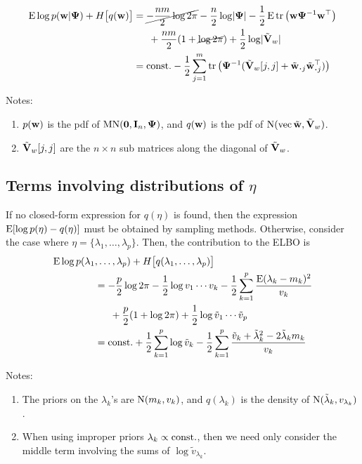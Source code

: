 \begin{align*}
  \E \log p(\bw|\bPsi) + H \big[q(\bw) \big] 
  &= \cancel{-\half[nm]\log 2\pi} - \half[n]\log\abs{\bPsi} - \half\E\tr \big( \bw \bPsi^{-1} \bw^\top \big) \\
  &\phantom{==} + \half[nm](1 + \cancel{\log 2\pi}) + \half\log\abs{\tilde\bV_w} \\
  &= \const 
  - \half \sum_{j=1}^m \tr \big(\bPsi^{-1} (\tilde\bV_w[j,j]  + \tilde\bw_{\bigcdot j}\tilde\bw_{\bigcdot j}^\top)\big)
\end{align*}

Notes:
\begin{enumerate}
  \item $p(\bw)$ is the pdf of $\MN(\bzero,\bI_n,\bPsi)$, and $q(\bw)$ is the pdf of $\N(\vecc \tilde\bw,\tilde\bV_w)$.
  \item $\tilde\bV_w[j,j]$ are the $n \times n$ sub matrices along the diagonal of $\tilde\bV_w$.
\end{enumerate}

\subsection{Terms involving distributions of $\eta$}

If no closed-form expression for $q(\eta)$ is found, then the expression $\E [\log p(\eta) - q(\eta)]$ must be obtained by sampling methods.
Otherwise, consider the case where $\eta =\{\lambda_1,\dots,\lambda_p\}$.
Then, the contribution to the ELBO is
\begin{align*}
  \E \log p(\lambda_1 & ,\dots,\lambda_p) + H\big[q(\lambda_1,\dots,\lambda_p) \big] \\
  &=  -\half[p]\log 2\pi - \half\log v_1\cdots v_k - \half \sum_{k=1}^p  \frac{\E(\lambda_k - m_k)^2}{v_k} \\
  &\phantom{==} + \half[p](1 + \log 2\pi) + \half\log \tilde v_1\cdots \tilde v_p \\
  &= \const + \half \sum_{k=1}^p \log \tilde v_k - \half \sum_{k=1}^p  \frac{\tilde v_k + \tilde\lambda_k^2 - 2\tilde\lambda_k m_k}{v_k}
\end{align*}

Notes:
\begin{enumerate}
  \item The priors on the $\lambda_k$'s are $\N(m_k,v_k)$, and  $q(\lambda_k)$ is the density of $\N(\tilde\lambda_k, v_{\lambda_k})$.
  \item When using improper priors $\lambda_k \propto \const$, then we need only consider the middle term involving the sums of $\log \tilde v_{\lambda_k}$.
\end{enumerate}

